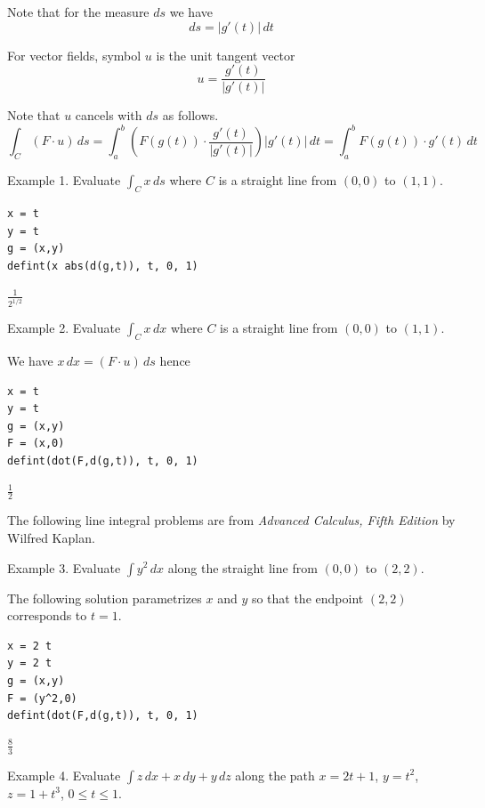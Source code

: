 \documentclass[12pt]{article}
\begin{document}
Note that for the measure $ds$ we have
\begin{equation*}
ds=|g'(t)|\,dt
\end{equation*}

For vector fields, symbol $u$ is the unit tangent vector
\begin{equation*}
u=\frac{g'(t)}{|g'(t)|}
\end{equation*}

Note that $u$ cancels with $ds$ as follows.
\begin{equation*}
\int_C(F\cdot u)\,ds
=\int_a^b
\left(F(g(t))\cdot\frac{g'(t)}{|g'(t)|}\right)
|g'(t)|\,dt
=\int_a^b F(g(t))\cdot g'(t)\,dt
\end{equation*}

Example 1. Evaluate $\int_Cx\,ds$
where $C$ is a straight line from $(0,0)$ to $(1,1)$.

{\color{blue}
\begin{verbatim}
x = t
y = t
g = (x,y)
defint(x abs(d(g,t)), t, 0, 1)
\end{verbatim}}

$\displaystyle \frac{1}{2^{1/2}}$

\bigskip
Example 2. Evaluate $\int_Cx\,dx$
where $C$ is a straight line from $(0,0)$ to $(1,1)$.

\bigskip
We have $x\,dx=(F\cdot u)\,ds$ hence

{\color{blue}
\begin{verbatim}
x = t
y = t
g = (x,y)
F = (x,0)
defint(dot(F,d(g,t)), t, 0, 1)
\end{verbatim}}

$\displaystyle \tfrac{1}{2}$

\bigskip
The following line integral problems are from
{\it Advanced Calculus, Fifth Edition} by Wilfred Kaplan.

\bigskip
Example 3. Evaluate $\int y^2\,dx$ along the straight
line from $(0,0)$ to $(2,2)$.

\bigskip
The following solution parametrizes $x$ and $y$ so that
the endpoint $(2,2)$ corresponds to $t=1$.

{\color{blue}
\begin{verbatim}
x = 2 t
y = 2 t
g = (x,y)
F = (y^2,0)
defint(dot(F,d(g,t)), t, 0, 1)
\end{verbatim}}

$\displaystyle \tfrac{8}{3}$

\bigskip
Example 4. Evaluate $\int z\,dx+x\,dy+y\,dz$
along the path
$x=2t+1$, $y=t^2$, $z=1+t^3$, $0\le t\le 1$.
\end{document}
